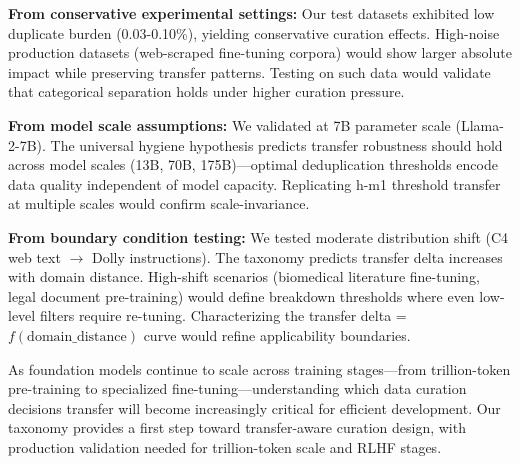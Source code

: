 \textbf{From conservative experimental settings:} Our test datasets exhibited low duplicate burden (0.03-0.10\%), yielding conservative curation effects. High-noise production datasets (web-scraped fine-tuning corpora) would show larger absolute impact while preserving transfer patterns. Testing on such data would validate that categorical separation holds under higher curation pressure.

\textbf{From model scale assumptions:} We validated at 7B parameter scale (Llama-2-7B). The universal hygiene hypothesis predicts transfer robustness should hold across model scales (13B, 70B, 175B)—optimal deduplication thresholds encode data quality independent of model capacity. Replicating h-m1 threshold transfer at multiple scales would confirm scale-invariance.

\textbf{From boundary condition testing:} We tested moderate distribution shift (C4 web text $\rightarrow$ Dolly instructions). The taxonomy predicts transfer delta increases with domain distance. High-shift scenarios (biomedical literature fine-tuning, legal document pre-training) would define breakdown thresholds where even low-level filters require re-tuning. Characterizing the transfer delta = $f(\text{domain\_distance})$ curve would refine applicability boundaries.

As foundation models continue to scale across training stages—from trillion-token pre-training to specialized fine-tuning—understanding which data curation decisions transfer will become increasingly critical for efficient development. Our taxonomy provides a first step toward transfer-aware curation design, with production validation needed for trillion-token scale and RLHF stages.
